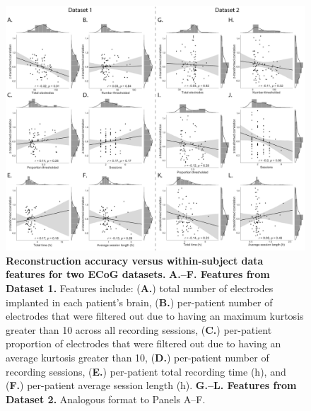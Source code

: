 \documentclass[10pt]{article}
\begin{document}
\begin{figure}[p]
\centering
\includegraphics[width=\textwidth]{figs/supplemental_6}
\caption{\textbf{Reconstruction accuracy versus within-subject data
    features for two ECoG datasets.} \textbf{A.--F.  Features from
    Dataset 1.}  Features include: (\textbf{A.}) total number of
  electrodes implanted in each patient's brain, (\textbf{B.})
  per-patient number of electrodes that were filtered out due to
  having an maximum kurtosis greater than 10 across all recording
  sessions, (\textbf{C.})  per-patient proportion of electrodes that
  were filtered out due to having an average kurtosis greater than 10,
  (\textbf{D.})  per-patient number of recording sessions,
  (\textbf{E.}) per-patient total recording time (h), and
  (\textbf{F.}) per-patient average session length (h).
  \textbf{G.--L. Features from Dataset 2.}  Analogous format to Panels
  A--F.}
\label{fig:supplemental_6}
\end{figure}
\end{document}

